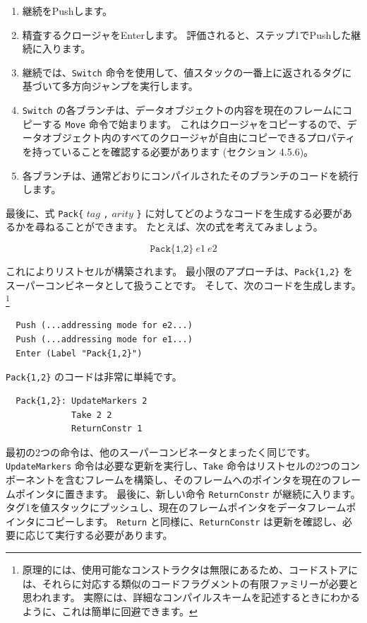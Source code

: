 \documentclass{jbook}
\begin{document}
\begin{enumerate}
	\item 継続をPushします。
	\item 精査するクロージャをEnterします。
	      評価されると、ステップ1でPushした継続に入ります。
	\item 継続では、\texttt{Switch} 命令を使用して、値スタックの一番上に返されるタグに基づいて多方向ジャンプを実行します。
	\item \texttt{Switch} の各ブランチは、データオブジェクトの内容を現在のフレームにコピーする \texttt{Move} 命令で始まります。
	      これはクロージャをコピーするので、データオブジェクト内のすべてのクロージャが自由にコピーできるプロパティを持っていることを確認する必要があります (セクション 4.5.6)。
	\item 各ブランチは、通常どおりにコンパイルされたそのブランチのコードを続行します。
\end{enumerate}

最後に、式 \texttt{Pack\{} $tag$ \texttt{,} $arity$ \texttt{\}} に対してどのようなコードを生成する必要があるかを尋ねることができます。
たとえば、次の式を考えてみましょう。

\[\texttt{Pack\{1,2\}} ~ e1 ~ e2\]

これによりリストセルが構築されます。
最小限のアプローチは、\texttt{Pack\{1,2\}} をスーパーコンビネータとして扱うことです。
そして、次のコードを生成します。
\footnote{原理的には、使用可能なコンストラクタは無限にあるため、コードストアには、それらに対応する類似のコードフラグメントの有限ファミリーが必要と思われます。
	実際には、詳細なコンパイルスキームを記述するときにわかるように、これは簡単に回避できます。}

\begin{verbatim}
  Push (...addressing mode for e2...)
  Push (...addressing mode for e1...)
  Enter (Label "Pack{1,2}")
\end{verbatim}

\texttt{Pack\{1,2\}} のコードは非常に単純です。

\begin{verbatim}
  Pack{1,2}: UpdateMarkers 2
             Take 2 2
             ReturnConstr 1
\end{verbatim}

最初の2つの命令は、他のスーパーコンビネータとまったく同じです。
\texttt{UpdateMarkers} 命令は必要な更新を実行し、\texttt{Take} 命令はリストセルの2つのコンポーネントを含むフレームを構築し、そのフレームへのポインタを現在のフレームポインタに置きます。
最後に、新しい命令 \texttt{ReturnConstr} が継続に入ります。
タグ1を値スタックにプッシュし、現在のフレームポインタをデータフレームポインタにコピーします。
\texttt{Return} と同様に、\texttt{ReturnConstr} は更新を確認し、必要に応じて実行する必要があります。
\end{document}
